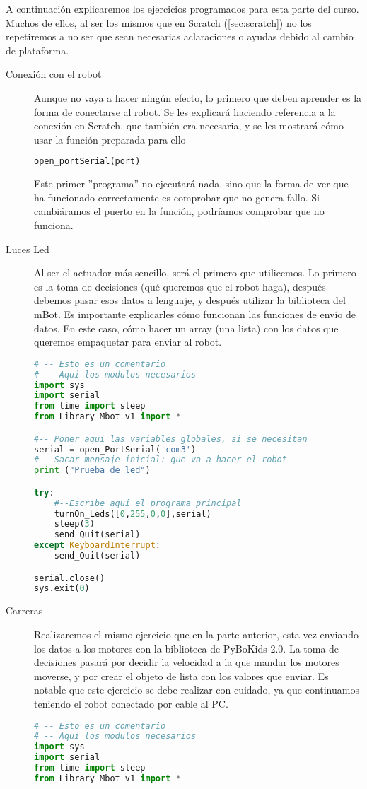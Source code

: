 A continuación explicaremos los ejercicios programados para esta parte del curso. Muchos de ellos, al ser los mismos que en Scratch (\ref{sec:scratch}) no los repetiremos a no ser que sean necesarias aclaraciones o ayudas debido al cambio de plataforma.

\begin{description}
	\item [Conexión con el robot] Aunque no vaya a hacer ningún efecto, lo primero que deben aprender es la forma de conectarse al robot. Se les explicará haciendo referencia a la conexión en Scratch, que también era necesaria, y se les mostrará cómo usar la función preparada para ello 
	\begin{lstlisting}[language=Python]
		open_portSerial(port)
	\end{lstlisting}
	Este primer ''programa'' no ejecutará nada, sino que la forma de ver que ha funcionado correctamente es comprobar que no genera fallo. Si cambiáramos el puerto en la función, podríamos comprobar que no funciona.
	\item [Luces Led] Al ser el actuador más sencillo, será el primero que utilicemos.  Lo primero es la toma de decisiones (qué queremos que el robot haga), después debemos pasar esos datos a lenguaje, y después utilizar la biblioteca del mBot. Es importante explicarles cómo funcionan las funciones de envío de datos. En este caso, cómo hacer un array (una lista) con los datos que queremos empaquetar para enviar al robot.
\begin{lstlisting}[language=python,caption={Solución de referencia del ejercicio},captionpos=b,tabsize=2]
# -- Esto es un comentario		
# -- Aqui los modulos necesarios
import sys
import serial
from time import sleep
from Library_Mbot_v1 import *

#-- Poner aqui las variables globales, si se necesitan
serial = open_PortSerial('com3')
#-- Sacar mensaje inicial: que va a hacer el robot
print ("Prueba de led")

try:
	#--Escribe aqui el programa principal
	turnOn_Leds([0,255,0,0],serial)
	sleep(3)
	send_Quit(serial)
except KeyboardInterrupt:
	send_Quit(serial)

serial.close()
sys.exit(0)
\end{lstlisting}
	\item [Carreras] Realizaremos el mismo ejercicio que en la parte anterior, esta vez enviando los datos a los motores con la biblioteca de PyBoKids 2.0. La toma de decisiones pasará por decidir la velocidad a la que mandar los motores moverse, y por crear el objeto de lista con los valores que enviar. Es notable que este ejercicio se debe realizar con cuidado, ya que continuamos teniendo el robot conectado por cable al PC.
\begin{lstlisting}[language=python,caption={Solución de referencia del ejercicio},captionpos=b,tabsize=2]
# -- Esto es un comentario		
# -- Aqui los modulos necesarios
import sys
import serial
from time import sleep
from Library_Mbot_v1 import *


\end{lstlisting}
\end{description}

